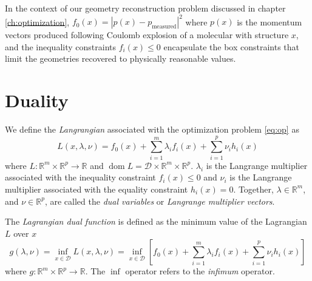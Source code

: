 In the context of our geometry reconstruction problem discussed in chapter \ref{ch:optimization}, $f_0(x) = |p(x)-p_\textrm{measured}|^2$ where $p(x)$ is the momentum vectors produced following Coulomb explosion of a molecular with structure $x$, and the inequality constraints $f_i(x) \leq 0$ encapsulate the box constraints that limit the geometries recovered to physically reasonable values.


\section{Duality}
We define the \emph{Langrangian} associated with the optimization problem \eqref{eq:op} as
\begin{equation}
L(x, \lambda, \nu) = f_0(x) + \sum_{i=1}^m \lambda_i f_i(x)
  + \sum_{i=1}^p \nu_i h_i(x)
\end{equation}
where $L: \mathbb{R}^m \times \mathbb{R}^p \rightarrow \mathbb{R}$ and $\operatorname{dom} L = \mathcal{D} \times \mathbb{R}^m \times \mathbb{R}^p$. $\lambda_i$ is the Langrange multiplier associated with the inequality constraint $f_i(x) \leq 0$ and $\nu_i$ is the Langrange multiplier associated with the equality constraint $h_i(x) = 0$. Together, $\lambda \in \mathbb{R}^m$, and $\nu \in \mathbb{R}^p$, are called the \emph{dual variables} or \emph{Langrange multiplier vectors}.

The \emph{Lagrangian dual function} is defined as the minimum value of the Lagrangian $L$ over $x$
\begin{equation}
g(\lambda, \nu) = \inf_{x \in \mathcal{D}} L(x, \lambda, \nu)
  = \inf_{x \in \mathcal{D}} \left[ f_0(x) + \sum_{i=1}^m \lambda_i f_i(x)
    + \sum_{i=1}^p \nu_i h_i(x) \right]
\end{equation}
where $g: \mathbb{R}^m \times \mathbb{R}^p \rightarrow \mathbb{R}$. The $\inf$ operator refers to the \emph{infimum} operator.

